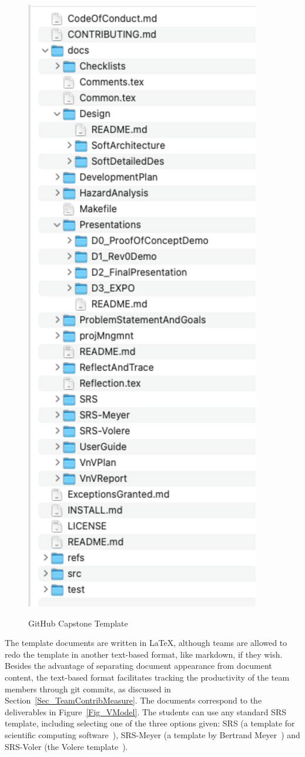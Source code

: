 \documentclass[10pt, conference]{IEEEtran}
\begin{document}
\begin{figure}[h!]
  \begin{center}
    {
      \includegraphics[width=0.7\columnwidth]{./figures/GitHubTemplate}
    }
    \caption{\label{Fig_GitHubTemplate} GitHub Capstone Template}
  \end{center}
\end{figure}

The template documents are written in \LaTeX, although teams are allowed to redo
the template in another text-based format, like markdown, if they wish. Besides
the advantage of separating document appearance from document content, the
text-based format facilitates tracking the productivity of the team members
through git commits, as discussed in Section~\ref{Sec_TeamContribMeasure}. The
documents correspond to the deliverables in Figure~\ref{Fig_VModel}. The
students can use any standard SRS template, including selecting one of the three
options given: SRS (a template for scientific computing
software~\cite{SmithAndLai2005}), SRS-Meyer (a template by Bertrand
Meyer~\cite{Meyer}) and SRS-Voler (the Volere
template~\cite{RobertsonAndRobertson1999Vol}).
\end{document}
